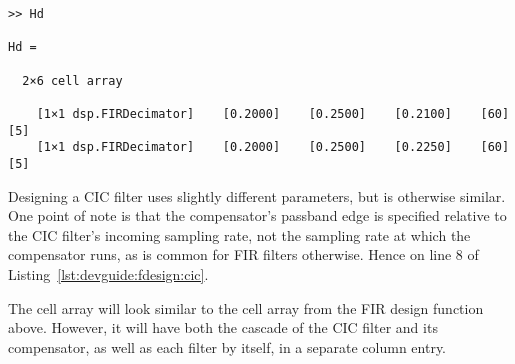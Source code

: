 \begin{tcolorbox}[
    title={
        \refstepcounter{listing}
        \textbf{Listing \thelisting:} Cell Array with Two FIR Filters
        \label{lst:devguide:fdesign:fir_cell}
        \addcontentsline{lol}{listing}{\protect\numberline{\thelisting}Cell Array with Two FIR Filters}
    }
]
\begin{verbatim}
>> Hd

Hd =

  2×6 cell array

    [1×1 dsp.FIRDecimator]    [0.2000]    [0.2500]    [0.2100]    [60]    [5]
    [1×1 dsp.FIRDecimator]    [0.2000]    [0.2500]    [0.2250]    [60]    [5]
\end{verbatim}
\end{tcolorbox}

Designing  a   CIC  filter   uses  slightly   different  parameters,   but  is
otherwise  similar. One  point of  note  is  that the  compensator's  passband
edge  is  specified relative  to  the  CIC  filter's incoming  sampling  rate,
not  the  sampling rate  at  which  the compensator  runs,  as  is common  for
FIR  filters  otherwise. Hence    on  line  \num{8}  of
Listing~\ref{lst:devguide:fdesign:cic}.

The  cell array will look similar  to the cell array from the FIR
design  function above. However,  it will  have both  the cascade  of the  CIC
filter and its  compensator, as well as  each filter by itself,  in a separate
column entry.


